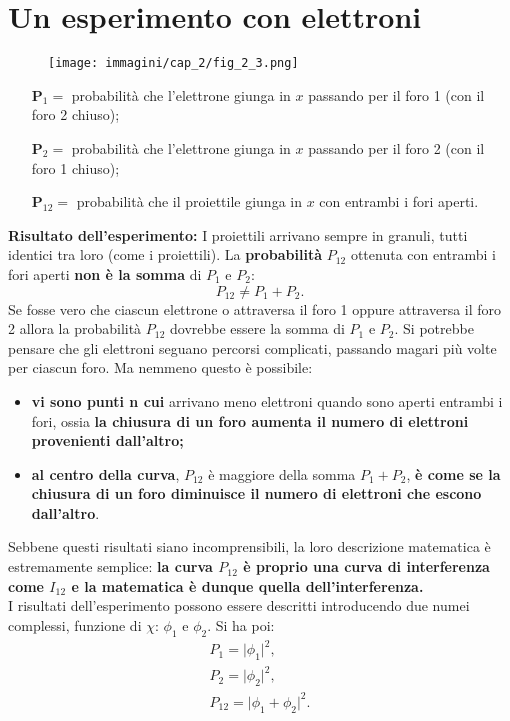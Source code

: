 \documentclass[a4paper,12pt,oneside]{book}
\begin{document}
\section*{Un esperimento con elettroni}
\begin{figure}[!htbp]
\begin{center}
\texttt{[image: immagini/cap\_2/fig\_2\_3.png]}
\end{center}
\end{figure}
\begin{itemize}
\item[\textbf{P$_1=$} ]probabilità che l'elettrone giunga in $x$ passando per il foro 1 (con il foro 2 chiuso);
\item[\textbf{P$_2=$} ]probabilità che l'elettrone giunga in $x$ passando per il foro 2 (con il foro 1 chiuso);
\item[\textbf{P$_{12}=$} ]probabilità che il proiettile giunga in $x$ con entrambi i fori aperti.
\end{itemize}
\textbf{Risultato dell'esperimento:} I proiettili arrivano sempre in granuli, tutti identici tra loro (come i proiettili). La \textbf{probabilità} $P_{12}$ ottenuta con entrambi i fori aperti \textbf{non è la somma} di $P_1$ e $P_2$:
	\begin{equation}
		\boxed{
			P_{12}\neq P_1+P_2.
			}
	\end{equation}
Se fosse vero che ciascun elettrone o attraversa il foro 1 oppure attraversa il foro 2 allora la probabilità $P_{12}$ dovrebbe essere la somma di $P_1$ e $P_2$. Si potrebbe pensare che gli elettroni seguano percorsi complicati, passando magari più volte per ciascun foro. Ma nemmeno questo è possibile:
\begin{itemize}
\item \textbf{vi sono punti n cui} arrivano meno elettroni quando sono aperti entrambi i fori, ossia \textbf{la chiusura di un foro aumenta il numero di elettroni provenienti dall'altro;}
\item \textbf{al centro della curva}, $P_{12}$ è maggiore della somma $P_1 + P_2$,  \textbf{è come se la chiusura di un foro diminuisce il numero di elettroni che escono dall'altro}.
\end{itemize}

Sebbene questi risultati siano incomprensibili, la loro descrizione matematica è estremamente semplice: \textbf{la curva $P_{12}$ è proprio una curva di interferenza come $I_{12}$ e la matematica è dunque quella dell'interferenza.}\\
I risultati dell'esperimento possono essere descritti introducendo due numei complessi, funzione di $\chi$: $\phi _1$ e $\phi _2$. Si ha poi:
\begin{equation}
\boxed{
  \begin{aligned}
& P_1= \lvert \phi _1 \rvert ^2, & \\
& P_2= \lvert \phi _2 \rvert ^2, &\\
& P_{12}= \lvert \phi _1 + \phi _2 \rvert ^2. 
\end{aligned}
}
\end{equation}
\end{document}
